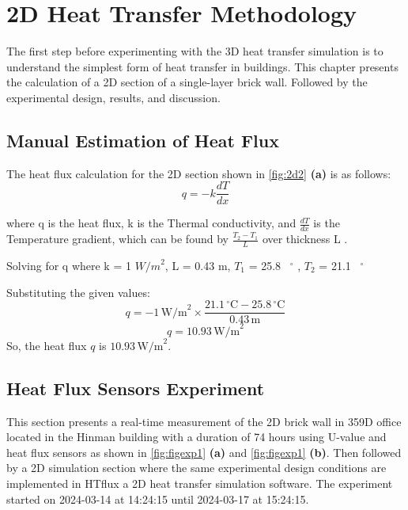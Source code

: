 
\chapter{2D Heat Transfer Methodology}
The first step before experimenting with the 3D heat transfer simulation is to understand the simplest form of heat transfer in buildings. This chapter presents the calculation of a 2D section of a single-layer brick wall. Followed by the experimental design, results, and discussion.

\section{Manual Estimation of Heat Flux}
The heat flux calculation for the 2D section shown in \ref{fig:2d2} \textbf{(a)} is as follows:
\begin{equation}
q = -k \frac{dT}{dx}
\end{equation}

where q is the heat flux,
k is the Thermal conductivity, and
$\frac{dT}{dx}$ is the Temperature gradient, which can be found by $\frac{T_2 - T_1}{L}$ over thickness L \cite{heattransfund}. 

Solving for q where k = 1 ${W/m}^2$, 
L = 0.43 m,
$T_1$ = 25.8 \, $^\circ$ , 
$T_2$  = 21.1 \, $^\circ$ 



Substituting the given values:
\[ q = -1 \, \text{W/m}^2 \times \frac{21.1 \, ^\circ \text{C} - 25.8 \, ^\circ \text{C}}{0.43 \, \text{m}} \]
\[ q = 10.93 \, \text{W/m}^2 \]
So, the heat flux \( q \) is \( 10.93 \, \text{W/m}^2 \).





\section{Heat Flux Sensors Experiment}



This section presents a real-time measurement of the 2D brick wall in 359D office located in the Hinman building with a duration of 74 hours using U-value and heat flux sensors as shown in \ref{fig:figexp1} \textbf{(a)} and \ref{fig:figexp1} \textbf{(b)}. Then followed by a 2D simulation section where the same experimental design conditions are implemented in HTflux \cite{HTflux} a 2D heat transfer simulation software. The experiment started on 2024-03-14 at 14:24:15 until 2024-03-17 at 15:24:15. 


